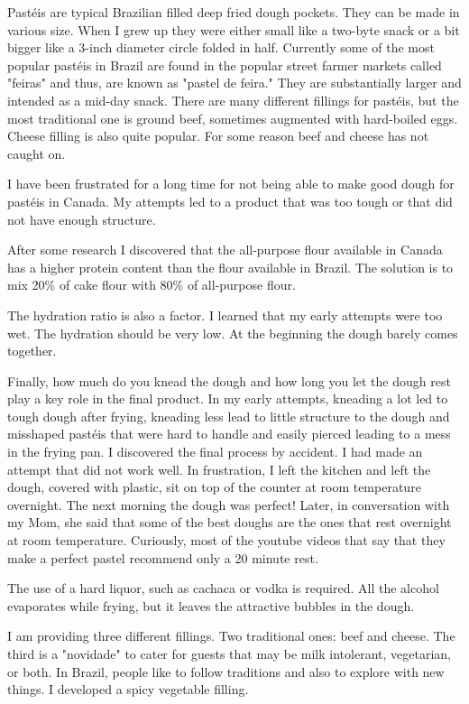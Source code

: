 \documentclass[11pt,letterpaper]{article}
\begin{document}


Past\'{e}is are typical Brazilian filled deep fried dough pockets. They can be made in various size. When I grew up they were either small like a two-byte snack or a bit bigger like a 3-inch diameter circle folded in half. Currently some of the most popular past\'{e}is in Brazil are found in the popular street farmer markets called "feiras" and thus, are known as "pastel de feira." They are substantially larger and intended as a mid-day snack. There are many different fillings for past\'{e}is, but the most traditional one is ground beef, sometimes augmented with hard-boiled eggs. Cheese filling is also quite popular. For some reason beef and cheese has not caught on. 

I have been frustrated for a long time for not being able to make good dough for past\'{e}is in Canada. My attempts led to a product that was too tough or that did not have enough structure. 

After some research I discovered that the all-purpose flour available in Canada has a higher protein content than the flour available in Brazil. The solution is to mix 20\% of cake flour with 80\% of all-purpose flour. 

The hydration ratio is also a factor. I learned that my early attempts were too wet. The hydration should be very low. At the beginning the dough barely comes together.

Finally,  how much do you knead the dough and how long you let the dough rest play a key role in the final product. In my early attempts, kneading a lot led to tough dough after frying, kneading less lead to little structure to the dough and misshaped past\'{e}is that were hard to handle and easily pierced leading to a mess in the frying pan. I discovered the final process by accident. I had made an attempt that did not work well. In frustration, I left the kitchen and left the dough, covered with plastic, sit on top of the counter at room temperature overnight. The next morning the dough was perfect! Later, in conversation with my Mom, she said that some of the best doughs are the ones that rest overnight at room temperature. Curiously, most of the youtube videos that say that they make a perfect pastel recommend only a 20 minute rest. 

The use of a hard liquor, such as cachaca or vodka is required. All the alcohol evaporates while frying, but it leaves the attractive bubbles in the dough.


I am providing three different fillings. Two traditional ones: beef and cheese. The third is a "novidade" to cater for guests that may be milk intolerant, vegetarian, or both.  In Brazil, people like to follow traditions and also to explore with new things. I developed a spicy vegetable filling.
\end{document}
